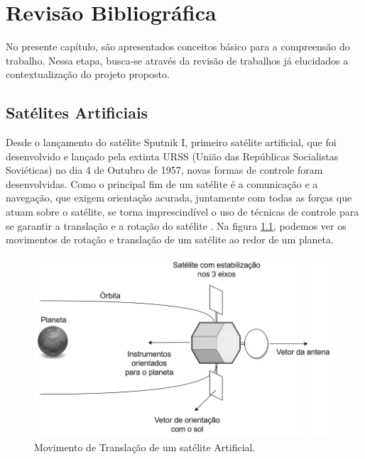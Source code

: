 \chapter{Revisão Bibliográfica}

No presente capítulo, são apresentados conceitos básico para a compreensão do trabalho. Nessa etapa, busca-se através da revisão de trabalhos já elucidados a contextualização do projeto proposto.



\section{Satélites Artificiais} %

Desde o lançamento do satélite Sputnik I, primeiro satélite artificial, que foi desenvolvido e lançado pela extinta URSS (União das Repúblicas Socialistas Soviéticas) no dia 4 de Outubro de 1957, novas formas de controle foram desenvolvidas. Como o principal fim de um satélite é a comunicação e a navegação, que exigem orientação acurada, juntamente com todas as forças que atuam sobre o satélite, se torna imprescindível o uso de técnicas de controle para se garantir a translação e a rotação do satélite \cite{Brown2002}. Na figura \ref{fig:rotational_brown_p256}, podemos ver os movimentos de rotação e translação de um satélite ao redor de um planeta.

\begin{figure}[H]
  \caption{Movimento de Translação de um satélite Artificial.}
  \begin{center}
      \includegraphics[scale=0.5]{img/rotational_brown_p256}
  \end{center}
  \label{fig:rotational_brown_p256}
\end{figure}

